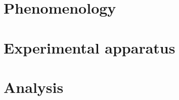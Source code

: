 \documentclass[a4paper,11pt,twoside]{StyleThese}
\begin{document}
\frontmatter



\dominitoc


\cleardoublepage

\tableofcontents




\cleardoublepage
\mainmatter

\part{Phenomenology}


\part{Experimental apparatus}


\part{Analysis}




% 
%


\appendix

% 


% 












\backmatter

\newpage
\thispagestyle{empty}
\strut
\newpage
\end{document}
